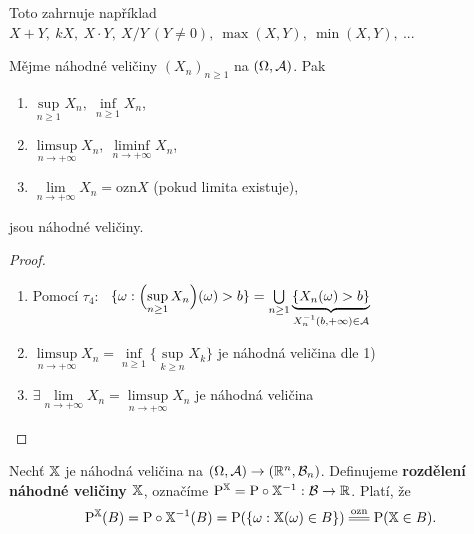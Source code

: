 \begin{remark}
	Toto zahrnuje například $X+Y,~kX,~X\cdot Y,~X/Y~(Y\neq 0),~\max(X,Y),~\min(X,Y),~...$
\end{remark}
\begin{theorem}
	Mějme náhodné veličiny $(X_n)_{n\geq 1}$ na $(\Omega,\mathcal{A})$. Pak 
	\begin{enumerate}
		\item $\sup\limits_{n\geq 1} X_n,~\inf\limits_{n\geq 1} X_n$,
		\item $\limsup\limits_{n\to +\infty}X_n,~\liminf\limits_{n\to +\infty}X_n $,
		\item $\lim\limits_{n\to +\infty}X_n\equal{\text{ozn}}X$ (pokud limita existuje),
	\end{enumerate}
jsou náhodné veličiny.
\begin{proof}
	\begin{enumerate}
		\item Pomocí $\tau_4$:~ $\{ \omega:\Bigl( \sup\limits_{n\geq 1}X_n \Bigr)(\omega) >b \}=\bigcup\limits_{n \geq 1}\underbrace{\{ X_n(\omega)>b \}}_{X_n^{-1}(b,+\infty) \in \mathcal{A}}$
		\item $\limsup\limits_{n\to +\infty}X_n = \inf \limits_{n\geq 1}\{ \sup\limits_{k\geq n}X_k \}$ je náhodná veličina dle 1)
		\item $\exists \lim\limits_{n\to +\infty}X_n=\limsup\limits_{n\to +\infty}X_n$ je náhodná veličina
	\end{enumerate}
\end{proof}
\end{theorem}
\begin{define}
	Nechť $\mathbb{X}$ je náhodná veličina na $(\Omega,\mathcal{A})\to(\mathbb{R}^n,\mathcal{B}_n)$. Definujeme \textbf{rozdělení náhodné veličiny $\mathbb{X}$}, označíme $\mathrm{P}^{\mathbb{X}}=\mathrm{P}\circ \mathbb{X}^{-1}:\mathcal{B}\to\mathbb{R}$. Platí, že $$\PP^\X(B)=\PP\circ \X^{-1}(B)=\PP(\{ \omega:\X(\omega)\in B \}) \equal{\text{ozn}}\PP(\X \in B).$$
\end{define}

